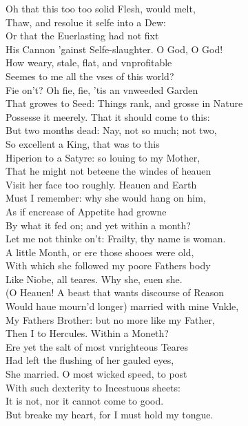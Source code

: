 \documentclass[a5paper,DIV=calc,11pt]{scrbook}
\begin{document}
\begin{drama*}
    \hamspeaks Oh that this too too solid Flesh, would melt,\\
    Thaw, and resolue it selfe into a Dew:\\
    Or that the Euerlasting had not fixt\\
    His Cannon 'gainst Selfe-slaughter. O God, O God!\\
    How weary, stale, flat, and vnprofitable\\
    Seemes to me all the vses of this world?\\
    Fie on't? Oh fie, fie, 'tis an vnweeded Garden\\
    That growes to Seed: Things rank, and grosse in Nature\\
    Possesse it meerely. That it should come to this:\\
    But two months dead: Nay, not so much; not two,\\
    So excellent a King, that was to this\\
    Hiperion to a Satyre: so louing to my Mother,\\
    That he might not beteene the windes of heauen\\
    Visit her face too roughly. Heauen and Earth\\
    Must I remember: why she would hang on him,\\
    As if encrease of Appetite had growne\\
    By what it fed on; and yet within a month?\\
    Let me not thinke on't: Frailty, thy name is woman.\\
    A little Month, or ere those shooes were old,\\
    With which she followed my poore Fathers body\\
    Like Niobe, all teares. Why she, euen she.\\
    (O Heauen! A beast that wants discourse of Reason\\
    Would haue mourn'd longer) married with mine Vnkle,\\
    My Fathers Brother: but no more like my Father,\\
    Then I to Hercules. Within a Moneth?\\
    Ere yet the salt of most vnrighteous Teares\\
    Had left the flushing of her gauled eyes,\\
    She married. O most wicked speed, to post\\
    With such dexterity to Incestuous sheets:\\
    It is not, nor it cannot come to good.\\
    But breake my heart, for I must hold my tongue.
    

\end{drama*}
\end{document}
